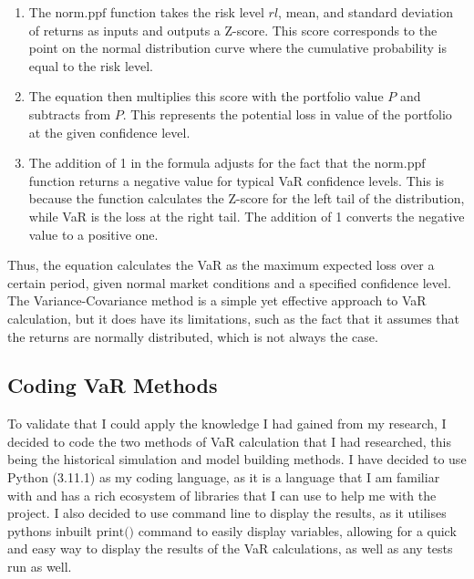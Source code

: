 \documentclass{article}
\begin{document}
\begin{enumerate}
    \item The \(\text{norm.ppf}\) function takes the risk level \( rl \), mean, and standard deviation of returns as inputs and outputs a Z-score. This score corresponds to the point on the normal distribution curve where the cumulative probability is equal to the risk level.
    \item The equation then multiplies this score with the portfolio value \( P \) and subtracts from \( P \). This represents the potential loss in value of the portfolio at the given confidence level.
    \item The addition of 1 in the formula adjusts for the fact that the \(\text{norm.ppf}\) function returns a negative value for typical VaR confidence levels. This is because the function calculates the Z-score for the left tail of the distribution, while VaR is the loss at the right tail. The addition of 1 converts the negative value to a positive one.
\end{enumerate}

Thus, the equation calculates the VaR as the maximum expected loss over a certain period, given normal market conditions and a specified confidence level. The Variance-Covariance method is a simple yet effective approach to VaR calculation, but it does have its limitations, such as the fact that it assumes that the returns are normally distributed, which is not always the case.\\\vspace{0.3cm}

\subsection{Coding VaR Methods}
To validate that I could apply the knowledge I had gained from my research, I decided to code the two methods of VaR calculation that I had researched, this being the historical simulation and model building methods. I have decided to use Python (3.11.1) as my coding language, as it is a language that I am familiar with and has a rich ecosystem of libraries that I can use to help me with the project. I also decided to use command line to display the results, as it utilises pythons inbuilt \(\text{print()}\) command to easily display variables, allowing for a quick and easy way to display the results of the VaR calculations, as well as any tests run as well.
\end{document}
